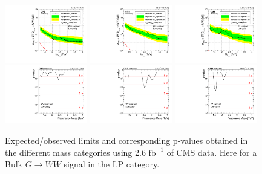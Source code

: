 \begin{figure}[h!]
\centering
\includegraphics[width=0.32\textwidth]{figures/analysis/search1/AN-15-211/limits/brazilianFlag_BulkWW_WWLP_13TeV_wPDF.pdf}
\includegraphics[width=0.32\textwidth]{figures/analysis/search1/AN-15-211/limits/brazilianFlag_BulkWW_WZLP_13TeV_wPDF.pdf}
\includegraphics[width=0.32\textwidth]{figures/analysis/search1/AN-15-211/limits/brazilianFlag_BulkWW_ZZLP_13TeV_wPDF.pdf}\\
\includegraphics[width=0.32\textwidth]{figures/analysis/search1/AN-15-211/pvalues/pvalue_BulkWWinWW_low_purity.pdf}
\includegraphics[width=0.32\textwidth]{figures/analysis/search1/AN-15-211/pvalues/pvalue_BulkWWinWZ_low_purity.pdf}
\includegraphics[width=0.32\textwidth]{figures/analysis/search1/AN-15-211/pvalues/pvalue_BulkWWinZZ_low_purity.pdf}
\caption{Expected/observed limits and corresponding p-values obtained in the different mass categories using 2.6 $\textrm{fb}^{-1}$ of CMS data. Here for a Bulk $G\rightarrow WW$ signal in the LP category.}
\label{fig:searchI:Limits_LPBulkWW}
\end{figure}


